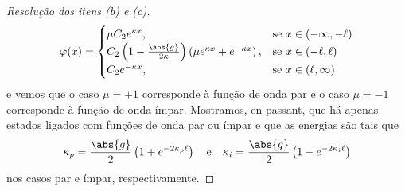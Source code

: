 \begin{proof}[Resolução dos itens (b) e (c)]
\begin{equation*}
        \varphi(x) = \begin{cases}
            \mu C_2 e^{\kappa x},&\text{se }x \in (-\infty, -\ell)\\
            C_2\left(1 - \frac{\abs{g}}{2\kappa}\right)\left(\mu e^{\kappa x} + e^{-\kappa x}\right),&\text{se }x \in (-\ell, \ell)\\
            C_2 e^{-\kappa x},&\text{se }x \in (\ell, \infty)
        \end{cases}
    \end{equation*}
    e vemos que o caso \(\mu = +1\) corresponde à função de onda par e o caso \(\mu = -1\) corresponde à função de onda ímpar. Mostramos, en passant, que há apenas estados ligados com funções de onda par ou ímpar e que as energias são tais que
    \begin{equation*}
        \kappa_p = \frac{\abs{g}}{2} \left(1 + e^{-2\kappa_p \ell}\right)
        \quad\text{e}\quad
        \kappa_i = \frac{\abs{g}}{2} \left(1 - e^{-2\kappa_i \ell}\right)
    \end{equation*}
    nos casos par e ímpar, respectivamente.
\end{proof}
